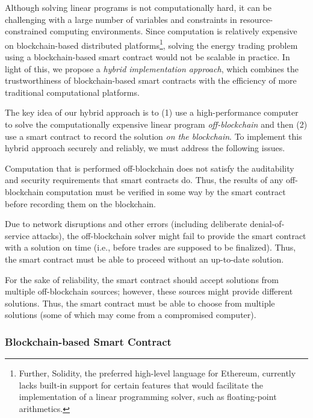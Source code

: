 Although solving linear programs is not computationally hard, it can be challenging with a large number of variables and constraints in resource-constrained computing environments.
Since computation is relatively expensive on blockchain-based distributed platforms\footnote{Further, Solidity, the preferred high-level language for Ethereum, currently lacks built-in support for certain features that would facilitate the implementation of a linear programming solver, such as floating-point arithmetics.}, solving the energy trading problem using a block\-chain-based smart contract would not be scalable in practice.
In light of this, we propose a \emph{hybrid implementation approach}, which combines the trustworthiness of blockchain-based smart contracts with the efficiency of more traditional computational platforms.

The key idea of our hybrid approach is to (1) use a high-performance computer to solve the computationally expensive linear program \emph{off-blockchain} and then (2) use a smart contract to record the solution \emph{on the blockchain}.
To implement this hybrid approach securely and reliably, we must address the following issues.
\begin{compactitem}
\item Computation that is performed off-blockchain does not satisfy the auditability and security requirements that smart contracts do. Thus, the results of any off-blockchain computation must be verified in some way by the smart contract before recording them on the blockchain.
\item Due to network disruptions and other errors (including deliberate denial-of-service attacks), the off-blockchain solver might fail to provide the smart contract with a solution on time (i.e., before trades are supposed to be finalized). Thus, the smart contract must be able to proceed without an up-to-date solution.
\item For the sake of reliability, the smart contract should accept solutions from multiple off-blockchain sources; however, these sources might provide different solutions.
Thus, the smart contract must be able to choose from multiple solutions (some of which may come from a compromised computer).
\end{compactitem}

\subsubsection{Blockchain-based Smart Contract}

